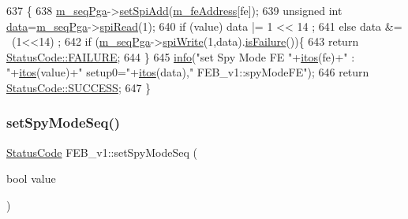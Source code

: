\begin{DoxyCode}
637                                                    \{
638   \hyperlink{classFEB__v1_a6c7804ac86796f233a8393043adf2e77}{m\_seqPga}->\hyperlink{classSeqPGA_ac998ce3a6d9b5f2e88cc8393f8c1df53}{setSpiAdd}(\hyperlink{classFEB__v1_a4e1945c2d5b434125f375e9d0fc6d99f}{m\_feAddress}[fe]);
639   \textcolor{keywordtype}{unsigned} \textcolor{keywordtype}{int} \hyperlink{classFEB__v1_a6bca4320bd3bbbc32efc81097f33421a}{data}=\hyperlink{classFEB__v1_a6c7804ac86796f233a8393043adf2e77}{m\_seqPga}->\hyperlink{classSeqPGA_ab3d0e5e5d4014bc7a92588a76b8713d4}{spiRead}(1);
640   \textcolor{keywordflow}{if} (value)  data |= 1 << 14  ;
641   \textcolor{keywordflow}{else}        data &= ~(1<<14) ;
642   \textcolor{keywordflow}{if} (\hyperlink{classFEB__v1_a6c7804ac86796f233a8393043adf2e77}{m\_seqPga}->\hyperlink{classSeqPGA_ad4421841ce4ce8b88ad13f63216f0743}{spiWrite}(1,data).\hyperlink{classStatusCode_a5dd22dc6eb2c52fc4cabc58f6dea2eb7}{isFailure}())\{
643     \textcolor{keywordflow}{return} \hyperlink{classStatusCode_a6f565cbeadc76d14c72f047e5e85eb4ba3da73d4c469762eb9d3c960368252b26}{StatusCode::FAILURE};
644   \}
645   \hyperlink{classObject_a644fd329ea4cb85f54fa6846484b84a8}{info}(\textcolor{stringliteral}{"set Spy Mode FE "}+\hyperlink{Tools_8h_af330027dbdafb9a30768b3613c553e60}{itos}(fe)+\textcolor{stringliteral}{" : "}+\hyperlink{Tools_8h_af330027dbdafb9a30768b3613c553e60}{itos}(value)+\textcolor{stringliteral}{" setup0="}+\hyperlink{Tools_8h_af330027dbdafb9a30768b3613c553e60}{itos}(data),\textcolor{stringliteral}{"
      FEB\_v1::spyModeFE"});
646   \textcolor{keywordflow}{return} \hyperlink{classStatusCode_a6f565cbeadc76d14c72f047e5e85eb4badd0da38d3ba0d922efd1f4619bc37ad8}{StatusCode::SUCCESS};
647 \}
\end{DoxyCode}
\mbox{\label{classFEB__v1_a9e13da349fc335ec44032fa0426c40d0}} 
\subsubsection{\texorpdfstring{set\+Spy\+Mode\+Seq()}{setSpyModeSeq()}}
{\footnotesize\ttfamily \hyperlink{classStatusCode}{Status\+Code} F\+E\+B\+\_\+v1\+::set\+Spy\+Mode\+Seq (\begin{DoxyParamCaption}\item[{bool}]{value }\end{DoxyParamCaption})}



